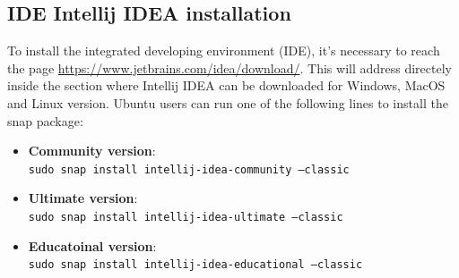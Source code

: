 \subsection{IDE Intellij IDEA installation}
To install the integrated developing environment (IDE), it's necessary to reach the page \url{https://www.jetbrains.com/idea/download/}. This will address directely inside the section where Intellij IDEA can be downloaded for Windows, MacOS and Linux version. Ubuntu users can run one of the following lines to install the snap package:\\
\begin{itemize}
\item \textbf{Community version}:\\
\texttt{sudo snap install intellij-idea-community --classic} 
\item \textbf{Ultimate version}:\\
\texttt{sudo snap install intellij-idea-ultimate --classic}
\item \textbf{Educatoinal version}:\\
\texttt{sudo snap install intellij-idea-educational --classic}
\end{itemize}




